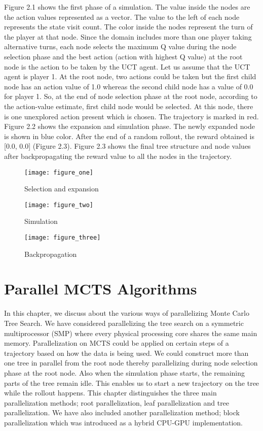 \documentclass[double,12pt]{beavtex}
\begin{document}
Figure 2.1 shows the first phase of a simulation. The value inside the nodes are the action values represented as a vector. The value to the left of each node represents the state visit count. The color inside the nodes represent the turn of the player at that node. Since the domain includes more than one player taking alternative turns, each node selects the maximum Q value during the node selection phase and the best action (action with highest Q value) at the root node is the action to be taken by the UCT agent. Let us assume that the UCT agent is player 1. At the root node, two actions could be taken but the first child node has an action value of 1.0 whereas the second child node has a value of 0.0 for player 1. So, at the end of node selection phase at the root node, according to the action-value estimate, first child node would be selected. At this node, there is one unexplored action present which is chosen. The trajectory is marked in red. Figure 2.2 shows the expansion and simulation phase. The newly expanded node is shown in blue color. After the end of a random rollout, the reward obtained is [0.0, 0.0] (Figure 2.3). Figure 2.3 shows the final tree structure and node values after backpropagating the reward value to all the nodes in the trajectory.

\begin{figure}[h!]
\centering
\texttt{[image: figure\_one]}
\caption{Selection and expansion}
\end{figure}

\begin{figure}[h!]
\centering
\texttt{[image: figure\_two]}
\caption{Simulation}
\end{figure}

\begin{figure}[h!]
\centering
\texttt{[image: figure\_three]}
\caption{Backpropagation}
\end{figure}

\chapter{Parallel MCTS Algorithms}
In this chapter, we discuss about the various ways of parallelizing Monte Carlo Tree Search. We have considered parallelizing the tree search on a symmetric multiprocessor (SMP) where every physical processing core shares the same main memory. Parallelization on MCTS could be applied on certain steps of a trajectory based on how the data is being used. We could construct more than one tree in parallel from the root node thereby parallelizing during node selection phase at the root node. Also when the simulation phase starts, the remaining parts of the tree remain idle. This enables us to start a new trajectory on the tree while the rollout happens. This chapter distinguishes the three main parallelization methods; root parallelization, leaf parallelization and tree parallelization. We have also included another parallelization method; block parallelization which was introduced as a hybrid CPU-GPU implementation.
\end{document}
